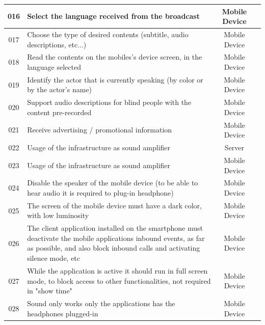 \documentclass[10pt, oneside, a4paper]{article}
\begin{document}
\begin{center}
\begin{longtable}{ | c | p{6cm} | c | p{5cm} |}
	016 & Select the language received from the broadcast & Mobile Device &\\ \hline
	017 & Choose the type of desired contents (subtitle, audio descriptions, etc...) & Mobile Device &\\ \hline	
	018 & Read the contents on the mobiles's device screen, in the language selected & Mobile Device &\\ \hline	
	019 & Identify the actor that is currently speaking (by color or by the actor's name)  & Mobile Device &\\ \hline
	020 & Support audio descriptions for blind people with the content pre-recorded & Mobile Device &\\ \hline
	021 & Receive advertising / promotional information & Mobile Device &\\ \hline
	022 & Usage of the infrastructure as sound amplifier  & Server &\\ \hline
	023 & Usage of the infrastructure as sound amplifier  & Mobile Device &\\ \hline
	024 & Disable the speaker of the mobile device (to be able to hear audio it is required to plug-in headphone) & Mobile Device &\\ \hline
	025 & The screen of the mobile device must have a dark color, with low luminosity & Mobile Device &\\ \hline
	026 & The client application installed on the smartphone must deactivate the mobile applications inbound events, as far as possible, and also block inbound calls and activating silence mode, etc & Mobile Device &\\ \hline
	027 & While the application is active it should run in full screen mode, to block access to other functionalities, not required in "show time" & Mobile Device &\\ \hline
	028 & Sound only works only the applications has the headphones plugged-in & Mobile Device &\\ \hline

	\hline
	\end{longtable}

\end{center}
\end{document}
